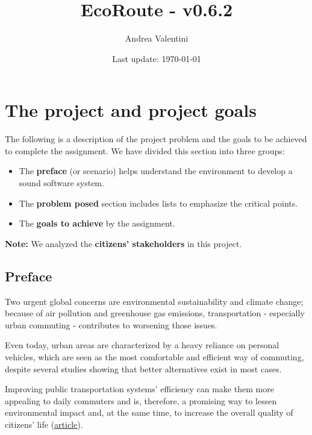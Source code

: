 \documentclass[a4paper]{article}
\newcommand{\highspace}{\vspace{1.2em}\noindent}
\begin{document}
    \author{Andrea Valentini}
    \title{EcoRoute - v0.6.2}
    \date{Last update: \today}
    \maketitle

    \newpage

    \tableofcontents

    \newpage

    \pagestyle{fancy}
    \fancyhead{} %
    \fancyhead[R]{\nouppercase{\leftmark\hfill\rightmark}}

    \section{The project and project goals}

    The following is a description of the project problem and the goals to be achieved to complete the assignment. We have divided this section into three groups:
    \begin{itemize}
        \item The \textbf{preface} (or scenario) helps understand the environment to develop a sound software system.

        \item The \textbf{problem posed} section includes lists to emphasize the critical points.

        \item The \textbf{goals to achieve} by the assignment.
    \end{itemize}
    \textbf{Note:} We analyzed the \textbf{citizens' stakeholders} in this project. 

    \subsection*{Preface}

    Two urgent global concerns are environmental sustainability and climate change; because of air pollution and greenhouse gas emissions, transportation - especially urban commuting - contributes to worsening those issues.

    \highspace
    Even today, urban areas are characterized by a heavy reliance on personal vehicles, which are seen as the most comfortable and efficient way of commuting, despite several studies showing that better alternatives exist in most cases.

    \highspace
    Improving public transportation systems' efficiency can make them more appealing to daily commuters and is, therefore, a promising way to lessen environmental impact and, at the same time, to increase the overall quality of citizens' life (\href{https://journals.plos.org/plosone/article?id=10.1371/journal.pone.0223650}{article}).
\end{document}
